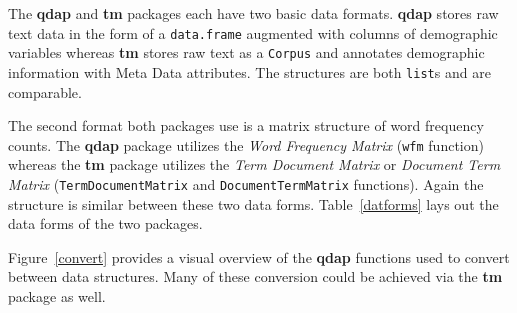 \documentclass{article}\usepackage[]{graphicx}\usepackage[]{color}
\begin{document}
\hspace{.4cm} The \textbf{qdap} and \textbf{tm} packages each have two basic data formats.  \textbf{qdap} stores raw text data in the form of a \texttt{data.frame} augmented with columns of demographic variables whereas \textbf{tm} stores raw text as a \texttt{Corpus} and annotates demographic information with Meta Data attributes.  The structures are both \texttt{list}s and are comparable.

The second format both packages use is a matrix structure of word frequency counts.  The \textbf{qdap} package utilizes the \emph{Word Frequency Matrix} (\texttt{wfm} function) whereas the \textbf{tm} package utilizes the \emph{Term Document Matrix} or \emph{Document Term Matrix} (\texttt{TermDocumentMatrix} and \texttt{DocumentTermMatrix} functions).  Again the structure is similar between these two data forms.  Table~\ref{datforms} lays out the data forms of the two packages.



\begin{singlespace}
\begin{table}[!ht]
\begin{center}
\end{center}
\end{table}
\end{singlespace}

\noindent Figure~\ref{convert} provides a visual overview of the \textbf{qdap} functions used to convert between data structures.  Many of these conversion could be achieved via the \textbf{tm} package as well.
\end{document}
